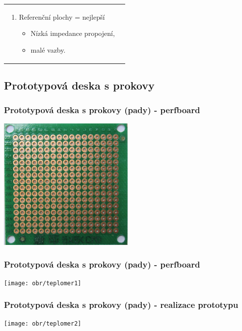 \documentclass{beamer}
\begin{document}
\begin{frame}
\begin{tabular}{ p{55mm} p{55mm} }
\begin{enumerate}
					\item Referenční plochy = nejlepší
						\begin{itemize}
							\item Nízká impedance propojení,
							\item malé vazby.
						\end{itemize}
				\end{enumerate}
			\end{tabular}
    
  \end{frame}
\subsection{\texorpdfstring{Prototypová deska s prokovy}{Prototypová deska s prokovy}}
  \begin{frame}
    \frametitle{Prototypová deska s prokovy (pady) - perfboard}
    \begin{center}
      \includegraphics[width=0.5\textwidth]{obr/perfBoard_bot.png}
    \end{center}
  \end{frame}
  \begin{frame}
    \frametitle{Prototypová deska s prokovy (pady) - perfboard}
    \begin{center}
      \texttt{[image: obr/teplomer1]}
    \end{center}
  \end{frame}
  \begin{frame}
    \frametitle{Prototypová deska s prokovy (pady) - realizace prototypu}
    \begin{center}
      \texttt{[image: obr/teplomer2]}
    \end{center}
  \end{frame}
\end{document}

